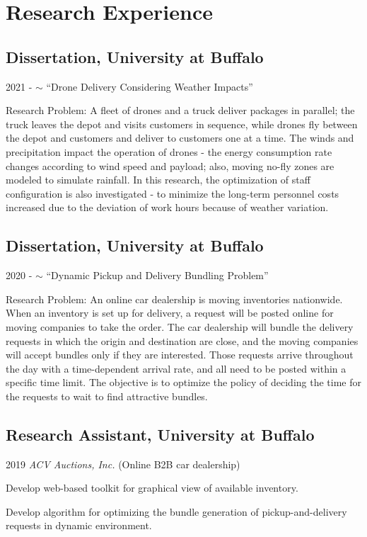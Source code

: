 \documentclass[12pt,letterpaper]{report}
\begin{document}
    \section*{Research Experience}
    \subsection*{Dissertation, University at Buffalo}
    \begin{tablist}
        \item[2021 - $\sim$] \tab{} ``Drone Delivery Considering Weather Impacts''
        \item \tab{} Research Problem: A fleet of drones and a truck deliver packages in parallel; the truck leaves the depot and visits customers in sequence, while drones fly between the depot and customers and deliver to customers one at a time. The winds and precipitation impact the operation of drones - the energy consumption rate changes according to wind speed and payload; also, moving no-fly zones are modeled to simulate rainfall. In this research, the optimization of staff configuration is also investigated - to minimize the long-term personnel costs increased due to the deviation of work hours because of weather variation.
    \end{tablist}
    \subsection*{Dissertation, University at Buffalo}
    \begin{tablist}
        \item[2020 - $\sim$] \tab{} ``Dynamic Pickup and Delivery Bundling Problem''
        \item \tab{} Research Problem: An online car dealership is moving inventories nationwide. When an inventory is set up for delivery, a request will be posted online for moving companies to take the order. The car dealership will bundle the delivery requests in which the origin and destination are close, and the moving companies will accept bundles only if they are interested. Those requests arrive throughout the day with a time-dependent arrival rate, and all need to be posted within a specific time limit. The objective is to optimize the policy of deciding the time for the requests to wait to find attractive bundles.
    \end{tablist}

    \subsection*{Research Assistant, University at Buffalo}
    \begin{tablist}
        \item[2019] \tab{} \textit{ACV Auctions, Inc.} (Online B2B car dealership)\\
        \item[] \tab{} Develop web-based toolkit for graphical view of available inventory. 
        \item[] \tab{} Develop algorithm for optimizing the bundle generation of pickup-and-delivery requests in dynamic environment.
    \end{tablist}
\end{document}
